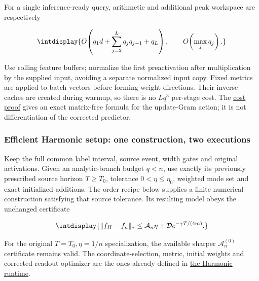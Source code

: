 
For a single inference-ready query, arithmetic and additional peak workspace are respectively


\begingroup\renewcommand{\theHequation}{intdisplay.220}
\begin{equation}
\intdisplay{
O\!\left(q_1d+\sum_{j=2}^Lq_jq_{j-1}+q_L\right),
\qquad O\!\left(\max_jq_j\right).
}
\label{int:eq-0101-cost-harmonic-query}
\end{equation}
\endgroup


Use rolling feature buffers; normalize the first preactivation after multiplication by the supplied input, avoiding a separate normalized input copy. Fixed metrics are applied to batch vectors before forming weight directions. Their inverse caches are created during warmup, so there is no \(Lq^3\) per-stage cost. The \hyperref[int:computational-cost-proofs]{cost proof} gives an exact matrix-free formula for the update-Gram action; it is not differentiation of the corrected predictor.


\subsubsection{Efficient Harmonic setup: one construction, two executions}
\label{int:harmonic-efficient-initialization}


Keep the full common label interval, source event, width gates and original activations. Given an analytic-branch budget \(q<n\), use exactly its previously prescribed source horizon \(T\ge T_0\), tolerance \(0<\eta\le\eta_0\), weighted mode set and exact initialized additions. The order recipe below supplies a finite numerical construction satisfying that source tolerance. Its resulting model obeys the unchanged certificate


\begingroup\renewcommand{\theHequation}{intdisplay.221}
\begin{equation}
\intdisplay{
\|f_H-f_n\|_*\le\mathcal A_n\eta+
                 \mathcal D e^{-\gamma T/(4m)}.
}
\label{int:eq-0102-setup-unchanged-error}
\end{equation}
\endgroup


For the original \(T=T_0,\allowbreak \eta=1/n\) specialization, the available sharper \(\mathcal A_n^{(0)}\) certificate remains valid. The coordinate-selection, metric, initial weights and corrected-readout optimizer are the ones already defined in \hyperref[int:harmonic-runtime-definition]{the Harmonic runtime}.


